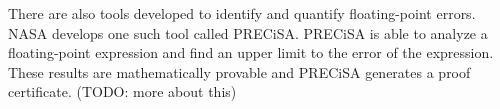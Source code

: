 \documentclass[11pt]{article}
\begin{document}
There are also tools developed to identify and quantify floating-point errors.
NASA develops one such tool called PRECiSA.
PRECiSA is able to analyze a floating-point expression and find an upper limit
  to the error of the expression.
These results are mathematically provable and PRECiSA generates a proof certificate.
(TODO: more about this)
\end{document}
